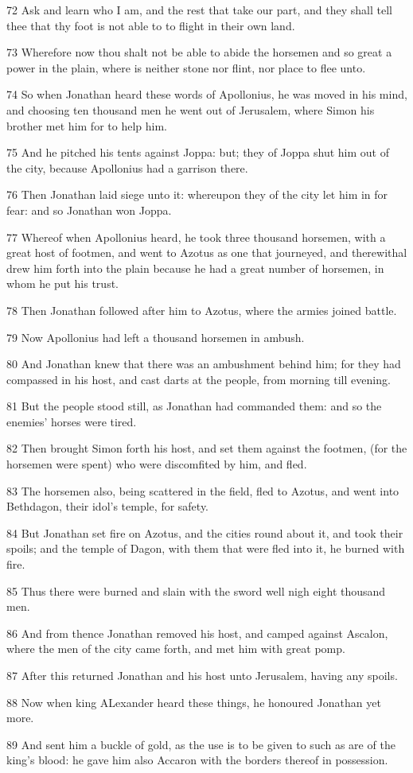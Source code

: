 \par 72 Ask and learn who I am, and the rest that take our part, and they shall tell thee that thy foot is not able to to flight in their own land.
\par 73 Wherefore now thou shalt not be able to abide the horsemen and so great a power in the plain, where is neither stone nor flint, nor place to flee unto.
\par 74 So when Jonathan heard these words of Apollonius, he was moved in his mind, and choosing ten thousand men he went out of Jerusalem, where Simon his brother met him for to help him.
\par 75 And he pitched his tents against Joppa: but; they of Joppa shut him out of the city, because Apollonius had a garrison there.
\par 76 Then Jonathan laid siege unto it: whereupon they of the city let him in for fear: and so Jonathan won Joppa.
\par 77 Whereof when Apollonius heard, he took three thousand horsemen, with a great host of footmen, and went to Azotus as one that journeyed, and therewithal drew him forth into the plain because he had a great number of horsemen, in whom he put his trust.
\par 78 Then Jonathan followed after him to Azotus, where the armies joined battle.
\par 79 Now Apollonius had left a thousand horsemen in ambush.
\par 80 And Jonathan knew that there was an ambushment behind him; for they had compassed in his host, and cast darts at the people, from morning till evening.
\par 81 But the people stood still, as Jonathan had commanded them: and so the enemies' horses were tired.
\par 82 Then brought Simon forth his host, and set them against the footmen, (for the horsemen were spent) who were discomfited by him, and fled.
\par 83 The horsemen also, being scattered in the field, fled to Azotus, and went into Bethdagon, their idol's temple, for safety.
\par 84 But Jonathan set fire on Azotus, and the cities round about it, and took their spoils; and the temple of Dagon, with them that were fled into it, he burned with fire.
\par 85 Thus there were burned and slain with the sword well nigh eight thousand men.
\par 86 And from thence Jonathan removed his host, and camped against Ascalon, where the men of the city came forth, and met him with great pomp.
\par 87 After this returned Jonathan and his host unto Jerusalem, having any spoils.
\par 88 Now when king ALexander heard these things, he honoured Jonathan yet more.
\par 89 And sent him a buckle of gold, as the use is to be given to such as are of the king's blood: he gave him also Accaron with the borders thereof in possession.

